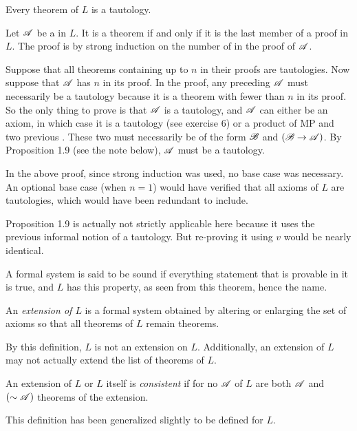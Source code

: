 \begin{proposition}
  Every theorem of \(L\) is a tautology.

  \prf{} Let \(\mathscr{A}\) be a \wf{} in \(L\). It is a theorem if and only if it is the last member of a proof in \(L\). The proof is by strong induction on the number of \wfs{} in the proof of \(\mathscr{A}\).

  Suppose that all theorems containing up to \(n\) \wfs{} in their proofs are tautologies. Now suppose that \(\mathscr{A}\) has \(n\) \wfs{} in its proof. In the proof, any \wf{} preceding \(\mathscr{A}\) must necessarily be a tautology because it is a theorem with fewer than \(n\) \wfs{} in its proof. So the only thing to prove is that \(\mathscr{A}\) is a tautology, and \(\mathscr{A}\) can either be an axiom, in which case it is a tautology (see exercise 6) or a product of MP and two previous \wfs{}. These two \wfs{} must necessarily be of the form \(\mathscr{B}\) and \((\mathscr{B} \rightarrow \mathscr{A})\). By Proposition 1.9 (see the note below), \(\mathscr{A}\) must be a tautology.

  \note{} In the above proof, since strong induction was used, no base case was necessary. An optional base case (when \(n = 1\)) would have verified that all axioms of \(L\) are tautologies, which would have been redundant to include.

  \note{} Proposition 1.9 is actually not strictly applicable here because it uses  the previous informal notion of a tautology. But re-proving it using \(v\) would be nearly identical.

  \note{} A formal system is said to be sound if everything statement that is provable in it is true, and \(L\) has this property, as seen from this theorem, hence the name.
\end{proposition}

\begin{definition}
  An \textit{extension of \(L\)} is a formal system obtained by altering or enlarging the set of axioms so that all theorems of \(L\) remain theorems.

  \note{} By this definition, \(L\) is not an extension on \(L\). Additionally, an extension of \(L\) may not actually extend the list of theorems of \(L\).
\end{definition}

\begin{definition}
  An extension of \(L\) or \(L\) itself is \textit{consistent} if for no \wf{} \(\mathscr{A}\) of \(L\) are both \(\mathscr{A}\) and \((\sim\mathscr{A})\) theorems of the extension.

  \note{} This definition has been generalized slightly to be defined for \(L\).
\end{definition}


